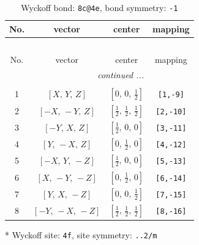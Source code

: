 \documentclass[fleqn,8pt]{jsarticle}
\begin{document}
\renewcommand{\arraystretch}{1.2}
\begin{longtable}{cccc}
\caption{Wyckoff bond: {\tt 8c@4e}, bond symmetry: {\tt -1}}
 \\
 \hline \hline
No. & vector & center & mapping \\ \hline \endfirsthead

\multicolumn{3}{l}{\tablename\ \thetable{}} \\
 \hline \hline
No. & vector & center & mapping \\ \hline \endhead

 \hline \hline
\multicolumn{3}{r}{\footnotesize\it continued ...} \\ \endfoot

 \hline \hline
\multicolumn{3}{r}{} \\ \endlastfoot

1 & $\left[ X,\, Y,\, Z \right]$ & $\left[ 0,\, 0,\, \frac{1}{2} \right]$ & {\tt [1,-9]} \\ \hline
2 & $\left[ - X,\, - Y,\, Z \right]$ & $\left[ \frac{1}{2},\, \frac{1}{2},\, \frac{1}{2} \right]$ & {\tt [2,-10]} \\ \hline
3 & $\left[ - Y,\, X,\, Z \right]$ & $\left[ \frac{1}{2},\, 0,\, 0 \right]$ & {\tt [3,-11]} \\ \hline
4 & $\left[ Y,\, - X,\, Z \right]$ & $\left[ 0,\, \frac{1}{2},\, 0 \right]$ & {\tt [4,-12]} \\ \hline
5 & $\left[ - X,\, Y,\, - Z \right]$ & $\left[ \frac{1}{2},\, 0,\, 0 \right]$ & {\tt [5,-13]} \\ \hline
6 & $\left[ X,\, - Y,\, - Z \right]$ & $\left[ 0,\, \frac{1}{2},\, 0 \right]$ & {\tt [6,-14]} \\ \hline
7 & $\left[ Y,\, X,\, - Z \right]$ & $\left[ 0,\, 0,\, \frac{1}{2} \right]$ & {\tt [7,-15]} \\ \hline
8 & $\left[ - Y,\, - X,\, - Z \right]$ & $\left[ \frac{1}{2},\, \frac{1}{2},\, \frac{1}{2} \right]$ & {\tt [8,-16]} \\
\end{longtable}
* Wyckoff site: {\tt 4f}, site symmetry: {\tt ..2/m}
\renewcommand{\arraystretch}{1.2}
\end{document}
